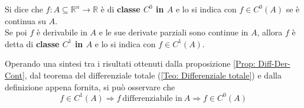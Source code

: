 \begin{definition} \label{Def:C0 e C1}
    Si dice che $f:A \subseteq \mathbb{R}^n\to \mathbb{R}$ è di \textbf{classe $C^0$ in $A$} e lo si indica con $f \in C^0(A)$ se è continua su $A$.\\
    Se poi $f$ è derivabile in $A$ e le sue derivate parziali sono continue in $A$, allora $f$ è detta di \textbf{classe $C^1$ in $A$} e lo si indica con $f \in C^1(A)$.\\
    \begin{oss}
        Operando una sintesi tra i risultati ottenuti dalla proposizione \ref{Prop: Diff-Der-Cont}, dal teorema del differenziale totale (\ref{Teo: Differenziale totale}) e dalla definizione appena fornita, si può osservare che
        \begin{equation}
            f \in C^1(A) \Rightarrow f\ \text{differenziabile in}\ A \Rightarrow f \in C^{0}(A)
        \end{equation}
    \end{oss} 
\end{definition}

